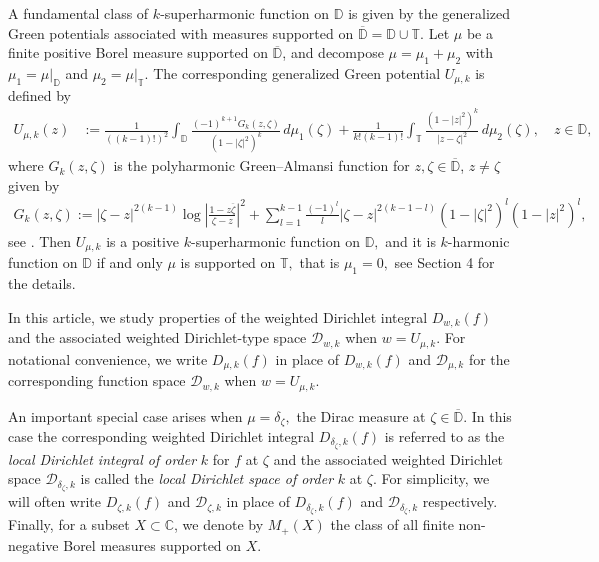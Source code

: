 \documentclass[10pt,oneside,reqno]{amsart}
\theoremstyle{definition}
\theoremstyle{remark}
\newcommand{\C}{\mathbb C}
\newcommand{\D}{\mathbb D}
\newcommand{\T}{\mathbb T}
\numberwithin{equation}{section}
\begin{document}
A fundamental class of $k$-superharmonic function on $\D$ is given by the generalized Green potentials associated with measures supported on $\overline{\mathbb D}=\D \cup \T.$ Let $\mu$ be a finite positive Borel measure supported on $\overline{\D}$, and decompose $\mu=\mu_1+\mu_2$ with $\mu_1=\mu|_{\D}$ and $\mu_2=\mu|_{\T}$. The corresponding generalized Green potential $U_{\mu,k}$ is defined by
\begin{align*}
    U_{\mu,k}(z) &:= \frac{1}{((k-1)!)^{2}} 
    \int_{\D} \frac{(-1)^{k+1} G_k(z,\zeta)}{(1-|\zeta|^{2})^{k}}\, d\mu_1(\zeta) 
    + \frac{1}{k!(k-1)!} \int_{\T} \frac{(1-|z|^{2})^{k}}{|z-\zeta|^{2}}\, d\mu_2(\zeta),\quad z\in \D,
\end{align*}
where $G_k(z,\zeta)$ is the polyharmonic Green–Almansi function
for $z, \zeta \in \overline{\mathbb{D}}$, $z \ne \zeta$  given by
\begin{align*}
G_k(z, \zeta) := |\zeta - z|^{2(k-1)} \log \left| \frac{1 - z\overline{\zeta}}{\zeta - z} \right|^2     + \sum_{l=1}^{k-1} \frac{(-1)^{l}}{l} |\zeta - z|^{2(k-1-l)} (1 - |\zeta|^2)^{l} (1 - |z|^2)^{l},
 \end{align*}
see \cite[Page 86]{Begehr07}. Then $U_{\mu,k}$ is a positive $k$-superharmonic function on $\D,$ and it is $k$-harmonic function on $\D$ if and only $\mu$ is supported on $\T,$ that is $\mu_1=0,$ see Section 4 for the details. 

In this article, we study properties of the weighted Dirichlet integral $D_{w,k}(f)$ and the associated weighted Dirichlet-type space $\mathscr D_{w,k}$ when $w=U_{\mu,k}.$ For notational convenience, we write $D_{\mu,k}(f)$ in place of $D_{w,k}(f)$ and $\mathscr D_{\mu,k}$ for the corresponding function space $\mathscr D_{w,k}$ when $w=U_{\mu,k}$. 

 
 An important special case arises when $\mu=\delta_{\zeta},$ the Dirac measure at $\zeta\in \overline{\D}.$ In this case the corresponding weighted Dirichlet integral $D_{\delta_{\zeta},k}(f)$ is referred to as the \textit{local Dirichlet integral of order} $k$ for $f$ at $\zeta$ and the associated weighted Dirichlet space $\mathscr D_{\delta_{\zeta},k}$ is called the\textit{ local Dirichlet space of order} $k$ at $\zeta.$ For simplicity, we will often write $D_{\zeta,k}(f)$ and $\mathscr D_{\zeta,k}$ in place of $D_{\delta_{\zeta},k}(f)$ and $\mathscr D_{\delta_{\zeta},k}$ respectively. Finally, for a subset $X\subset \C$, we denote by $M_+(X)$ the class of all finite non-negative Borel measures supported on $X$.
\end{document}

